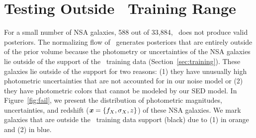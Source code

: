 \section{Testing Outside \sedflow~Training Range} \label{sec:fail}
For a small number of NSA galaxies, 588 out of 33,884, \sedflow~does not
produce valid posteriors. 
The normalizing flow of \sedflow~generates posteriors that are entirely outside
of the prior volume because the photometry or uncertainties of the NSA galaxies
lie outside of the support of the \sedflow~training data
(Section~\ref{sec:training}). 
These galaxies lie outside of the support for two reasons: 
(1) they have unusually high photometric uncertainties that are not accounted
for in our noise model or 
(2) they have photometric colors that cannot be modeled by our SED model. 
In Figure~\ref{fig:fail}, we present the distribution of photometric
magnitudes, uncertainties, and redshift ($\textbf{\textit{x}} = \{f_X, \sigma_X, z\}$) of
these NSA galaxies. 
We mark galaxies that are outside the \sedflow~training data support (black)
due to (1) in orange and (2) in blue. 

